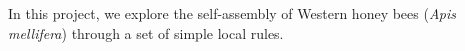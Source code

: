 \documentclass{article}
\begin{document}
In this project, we explore the self-assembly of Western honey bees
(\textit{Apis mellifera}) through a set of simple local rules.
\end{document}
